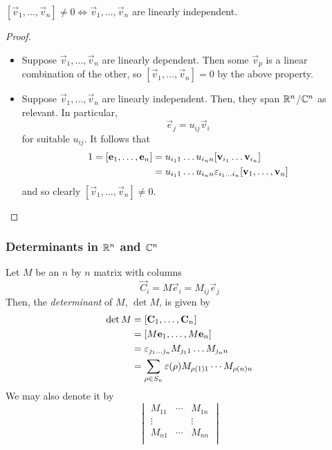 \documentclass{../template/note}
\begin{document}
    \begin{proposition}
        \([\vec v_1, \dots, \vec v_n] \neq 0 \iff \vec v_1, \dots, \vec v_n\) are linearly independent.
    \end{proposition}
    
    \begin{proof}
        \begin{itemize}
            \item[\(\implies\)] Suppose \(\vec v_1, \dots, \vec v_n\) are linearly dependent. Then some \(\vec v_p\) is a linear combination of the other, so \([\vec v_1, \dots, \vec v_n] = 0\) by the above property.
            \item[\(\impliedby\)] Suppose \(\vec v_1, \dots, \vec v_n\) are linearly independent. Then, they span \(\mathbb R^n\)/\(\mathbb C^n\) as relevant. In particular,
            \[
                \vec e_j = u_{ij} \vec v_i
            \]
            for suitable \(u_{ij}\). It follows that
            \begin{align*}
                1 = [\vec e_1, \dots, \vec e_n] &= u_{i_11}\dots u_{i_nn} [\vec v_{i_1}\dots \vec v_{i_n}] \\
                &= u_{i_11}\dots u_{i_nn} \lv{i_1\dots i_n}[\vec v_1, \dots, \vec v_n]
            \end{align*}
            and so clearly \([\vec v_1, \dots, \vec v_n] \neq 0\).
        \end{itemize}
    \end{proof}
    
    \subsubsection{Determinants in \(\mathbb R^n\) and \(\mathbb C^n\)}

    \begin{definition}
        Let \(M\) be an \(n\) by \(n\) matrix with columns
        \[
            \vec C_i = M \vec e_i = M_{ij} \vec e_j
        \]
        Then, the \emph{determinant} of \(M\), \(\det M\), is given by
        \begin{align*}
            \det M &= [\vec C_1, \dots, \vec C_n] \\
            &= [M \vec e_1, \dots, M \vec e_n] \\
            &= \lv{j_1\dots j_n}M_{j_11}\dots M_{j_nn} \\
            &= \sum_{\rho \in S_n} \varepsilon(\rho) M_{\rho(1)1}\cdots M_{\rho(n)n}
        \end{align*}
        We may also denote it by
        \[
            \begin{vmatrix}
             M_{11} & \cdots & M_{1n} \\
             \vdots &  & \vdots \\
             M_{n1} & \cdots & M_{nn} \\
            \end{vmatrix}
        \]
    \end{definition}
    
\end{document}
